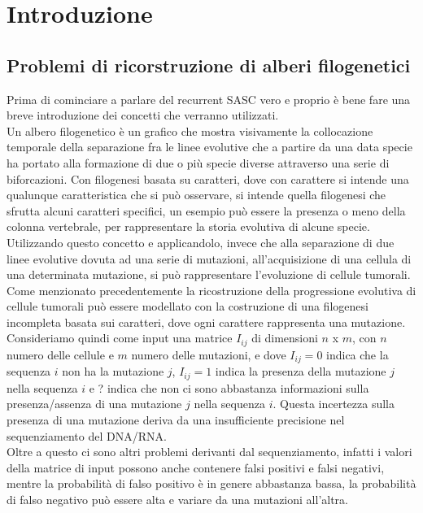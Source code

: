 \documentclass{report}
\begin{document}
{\pagestyle{plain}
  \tableofcontents
  \cleardoublepage}

\chapter{Introduzione}

\section{Problemi di ricorstruzione di alberi filogenetici}
  Prima di cominciare a parlare del recurrent SASC vero e proprio è bene fare una breve introduzione dei concetti che verranno utilizzati.\\
  Un albero filogenetico è un grafico che mostra visivamente la collocazione temporale della separazione fra le linee evolutive che a partire da una data specie ha portato alla formazione di due o più specie diverse attraverso una serie di biforcazioni. Con filogenesi basata su caratteri, dove con carattere si intende una qualunque caratteristica che si può osservare, si intende quella filogenesi che sfrutta alcuni caratteri specifici, un esempio può essere la presenza o meno della colonna vertebrale, per rappresentare la storia evolutiva di alcune specie.
  Utilizzando questo concetto e applicandolo, invece che alla separazione di due linee evolutive dovuta ad una serie di mutazioni, all'acquisizione di una cellula di una determinata mutazione, si può rappresentare l'evoluzione di cellule tumorali.\\
  Come menzionato precedentemente la ricostruzione della progressione evolutiva di cellule tumorali può essere modellato con la costruzione di una filogenesi incompleta basata sui caratteri, dove ogni carattere rappresenta una mutazione.
  Consideriamo quindi come input una matrice  ${I}_{ij}$ di dimensioni $n$ x $m$, con $n$ numero delle cellule e $m$ numero delle mutazioni, e dove ${I}_{ij} = 0$ indica che la sequenza $i$ non ha la mutazione $j$, ${I}_{ij} = 1$ indica la presenza della mutazione $j$ nella sequenza $i$ e ? indica che non ci sono abbastanza informazioni sulla presenza/assenza di una mutazione $j$ nella sequenza $i$. Questa incertezza sulla presenza di una mutazione deriva da una insufficiente precisione nel sequenziamento del DNA/RNA.\\
  Oltre a questo ci sono altri problemi derivanti dal sequenziamento, infatti i valori della matrice di input possono anche contenere falsi positivi e falsi negativi, mentre la probabilità di falso positivo è in genere abbastanza bassa, la probabilità di falso negativo può essere alta e variare da una mutazioni all'altra.
\end{document}
